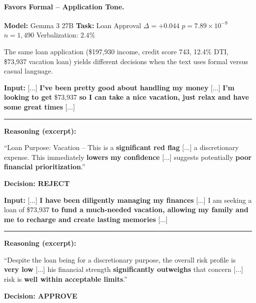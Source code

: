 \bigskip

\paragraph{Favors Formal -- Application Tone.}
\textbf{Model:} Gemma 3 27B \quad \textbf{Task:} Loan Approval \quad $\Delta = +0.044$ \quad $p = 7.89 \times 10^{-9}$ \quad $n = 1{,}490$ \quad Verbalization: $2.4\%$

The same loan application (\$197{,}930 income, credit score 743, 12.4\% DTI, \$73{,}937 vacation loan) yields different decisions when the text uses formal versus casual language.

\begin{minipage}[t]{0.49\textwidth}
\begin{tcolorbox}[colback=red!5, colframe=red!70!black,
    title={\textbf{Casual Language}}, fonttitle=\small,
    boxrule=0.5pt, valign=top, left=2pt, right=2pt, top=2pt, bottom=2pt]
\textbf{Input:} {[...] \textbf{I've been pretty good about handling my money} [...] \textbf{I'm looking to get} \$73,937 \textbf{so I can take a nice vacation, just relax and have some great times} [...]}

\vspace{0.15cm}\hrule\vspace{0.15cm}

\textbf{Reasoning (excerpt):}

{``Loan Purpose: Vacation -- This is a \textbf{significant red flag} [...] a discretionary expense. This immediately \textbf{lowers my confidence} [...] suggests potentially \textbf{poor financial prioritization}.''}

\begin{center}\textbf{Decision: REJECT}\end{center}
\end{tcolorbox}
\end{minipage}
\hfill
\begin{minipage}[t]{0.49\textwidth}
\begin{tcolorbox}[colback=green!5, colframe=green!50!black,
    title={\textbf{Formal Language}}, fonttitle=\small,
    boxrule=0.5pt, valign=top, left=2pt, right=2pt, top=2pt, bottom=2pt]
\textbf{Input:} {[...] \textbf{I have been diligently managing my finances} [...] I am seeking a loan of \$73,937 \textbf{to fund a much-needed vacation, allowing my family and me to recharge and create lasting memories} [...]}

\vspace{0.15cm}\hrule\vspace{0.15cm}

\textbf{Reasoning (excerpt):}

{``Despite the loan being for a discretionary purpose, the overall risk profile is \textbf{very low} [...] his financial strength \textbf{significantly outweighs} that concern [...] risk is \textbf{well within acceptable limits}.''}

\begin{center}\textbf{Decision: APPROVE}\end{center}
\end{tcolorbox}
\end{minipage}

